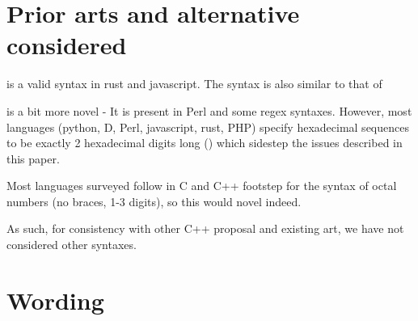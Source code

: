 \documentclass{wg21}
\begin{document}
    \section{Prior arts and alternative considered}
    
     is a valid syntax in rust and javascript.
    The syntax is also similar to that of 
    
     is a bit more novel - It is present in Perl and some regex syntaxes.
    However, most languages (python, D, Perl, javascript, rust, PHP) specify hexadecimal sequences to be exactly 2 hexadecimal digits long () which sidestep the issues described in this paper.
    
    Most languages surveyed follow in C and C++ footstep for the syntax of octal numbers (no braces, 1-3 digits), so this would novel indeed.
    
    As such, for consistency with other C++ proposal and existing art, we have not considered other syntaxes.
    
    \section{Wording}
    
\end{document}
